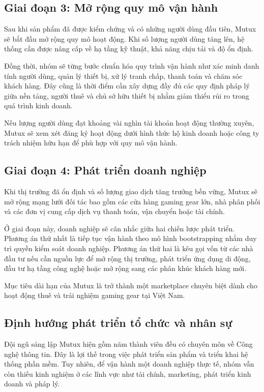 \subsection{Giai đoạn 3: Mở rộng quy mô vận hành}
Sau khi sản phẩm đã được kiểm chứng và có những người dùng đầu tiên, Mutux sẽ bắt đầu mở rộng quy mô hoạt động. Khi số lượng người dùng tăng lên, hệ thống cần được nâng cấp về hạ tầng kỹ thuật, khả năng chịu tải và độ ổn định.

Đồng thời, nhóm sẽ từng bước chuẩn hóa quy trình vận hành như xác minh danh tính người dùng, quản lý thiết bị, xử lý tranh chấp, thanh toán và chăm sóc khách hàng. Đây cũng là thời điểm cần xây dựng đầy đủ các quy định pháp lý giữa nền tảng, người thuê và chủ sở hữu thiết bị nhằm giảm thiểu rủi ro trong quá trình kinh doanh.

Nếu lượng người dùng đạt khoảng vài nghìn tài khoản hoạt động thường xuyên, Mutux sẽ xem xét đăng ký hoạt động dưới hình thức hộ kinh doanh hoặc công ty trách nhiệm hữu hạn để phù hợp với quy mô vận hành.

\subsection{Giai đoạn 4: Phát triển doanh nghiệp}
Khi thị trường đã ổn định và số lượng giao dịch tăng trưởng bền vững, Mutux sẽ mở rộng mạng lưới đối tác bao gồm các cửa hàng gaming gear lớn, nhà phân phối và các đơn vị cung cấp dịch vụ thanh toán, vận chuyển hoặc tài chính.

Ở giai đoạn này, doanh nghiệp sẽ cân nhắc giữa hai chiến lược phát triển. Phương án thứ nhất là tiếp tục vận hành theo mô hình bootstrapping nhằm duy trì quyền kiểm soát doanh nghiệp. Phương án thứ hai là kêu gọi vốn từ các nhà đầu tư nếu cần nguồn lực để mở rộng thị trường, phát triển ứng dụng di động, đầu tư hạ tầng công nghệ hoặc mở rộng sang các phân khúc khách hàng mới.

Mục tiêu dài hạn của Mutux là trở thành một marketplace chuyên biệt dành cho hoạt động thuê và trải nghiệm gaming gear tại Việt Nam.

\subsection{Định hướng phát triển tổ chức và nhân sự}
Đội ngũ sáng lập Mutux hiện gồm năm thành viên đều có chuyên môn về Công nghệ thông tin. Đây là lợi thế trong việc phát triển sản phẩm và triển khai hệ thống phần mềm. Tuy nhiên, để vận hành một doanh nghiệp thực tế, nhóm vẫn còn thiếu kinh nghiệm ở các lĩnh vực như tài chính, marketing, phát triển kinh doanh và pháp lý.

